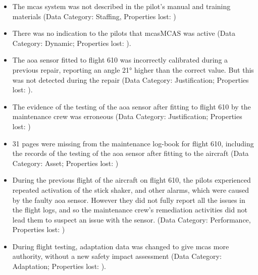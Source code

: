 \begin{itemize}
    \item The \gls{mcas} system was not described in the pilot's manual and training materials (Data Category: Staffing, Properties lost: )
    \item There was no indication to the pilots that \gls{mcas}MCAS was active (Data Category: Dynamic; Properties lost: ).
    \item The \gls{aoa} sensor fitted to flight 610 was incorrectly calibrated during a previous repair,
      reporting an angle 21° higher than the correct value.
      But this was not detected during the repair
      (Data Category: Justification; Properties lost: ).
    \item The evidence of the testing of the \gls{aoa} sensor after fitting to flight 610 by the maintenance crew was erroneous (Data Category: Justification; Properties lost: )
    \item 31 pages were missing from the maintenance log-book for flight 610, including the records of the testing of the \gls{aoa} sensor after fitting to the aircraft (Data Category: Asset; Properties lost: )
    \item During the previous flight of the aircraft on flight 610, the pilots experienced repeated activation of the stick shaker, and other alarms, which were caused by the faulty \gls{aoa} sensor.
      However they did not fully report all the issues in the flight logs, and so the maintenance crew's remediation activities did not lead them to suspect an issue with the sensor. (Data Category: Performance, Properties lost: )
    \item During flight testing, \cbstart\gls{adaptation data}\cbend{} was changed to give \gls{mcas} more authority, without a new safety impact assessment (Data Category: Adaptation; Properties lost: ).
\end{itemize}

